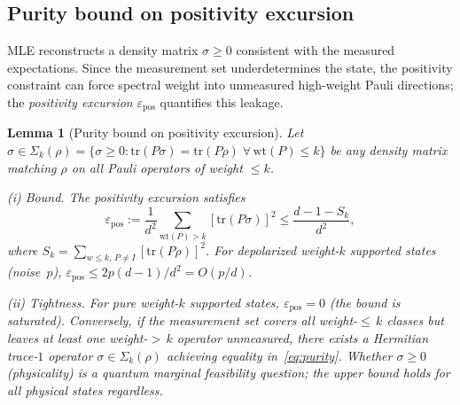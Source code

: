 \documentclass[twocolumn,prx,aps,superscriptaddress,longbibliography,floatfix]{revtex4-2}
\newtheorem{lemma}[theorem]{Lemma}
\newcommand{\pclaim}[4]{}
\begin{document}
\subsection{Purity bound on positivity excursion}
\label{sec:purity-bound}

MLE reconstructs a density matrix $\sigma \ge 0$ consistent
with the measured expectations.  Since the measurement set
underdetermines the state, the positivity constraint can force
spectral weight into unmeasured high-weight Pauli directions;
the \emph{positivity excursion} $\varepsilon_{\mathrm{pos}}$
quantifies this leakage.

\pclaim{env:lem:purity_main}{proved}{*}{lem:purity_main}%
\begin{lemma}[Purity bound on positivity excursion]
\label{lem:purity_main}
Let $\sigma \in \Sigma_k(\rho) = \{\sigma \ge 0 :
\mathrm{tr}(P\sigma) = \mathrm{tr}(P\rho)\;\forall\,
\mathrm{wt}(P) \le k\}$ be any density matrix matching $\rho$
on all Pauli operators of weight $\le k$.

\textup{(i)} \emph{Bound.}
The positivity excursion satisfies
\begin{equation}\label{eq:purity}
  \varepsilon_{\mathrm{pos}} := \frac{1}{d^2}
  \sum_{\mathrm{wt}(P) > k} [\mathrm{tr}(P\sigma)]^2
  \le \frac{d - 1 - S_k}{d^2},
\end{equation}
where $S_k = \sum_{w \le k,\, P \neq I} [\mathrm{tr}(P\rho)]^2$.
For depolarized weight-$k$ supported states (noise~$p$),
$\varepsilon_{\mathrm{pos}} \le 2p(d{-}1)/d^2 = O(p/d)$.

\textup{(ii)} \emph{Tightness.}
For pure weight-$k$ supported states, $\varepsilon_{\mathrm{pos}} = 0$
(the bound is saturated).  Conversely, if the measurement set covers all
weight-${\le}\,k$ classes but leaves at least one
weight-${>}\,k$ operator unmeasured, there exists a Hermitian
trace-$1$ operator $\sigma \in \Sigma_k(\rho)$ achieving
equality in~\eqref{eq:purity}.  Whether $\sigma \ge 0$
(physicality) is a quantum marginal feasibility
question; the upper bound holds for all physical states
regardless.
\end{lemma}
\end{document}
